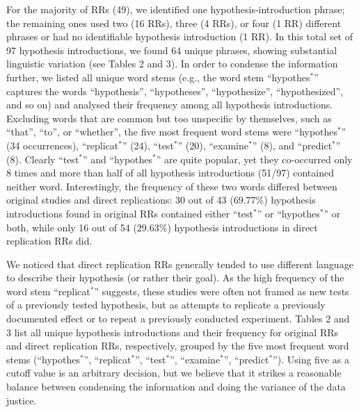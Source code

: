 \documentclass[british,,man,floatsintext]{apa6}
\begin{document}
For the majority of RRs (49), we identified one hypothesis-introduction phrase; the remaining ones used two (16 RRs), three (4 RRs), or four (1 RR) different phrases or had no identifiable hypothesis introduction (1 RR).
In this total set of 97 hypothesis introductions, we found 64 unique phrases, showing substantial linguistic variation (see Tables 2 and 3).
In order to condense the information further, we listed all unique word stems (e.g., the word stem \enquote{hypothes\(^\ast\)} captures the words \enquote{hypothesis}, \enquote{hypotheses}, \enquote{hypothesize}, \enquote{hypothesized}, and so on) and analysed their frequency among all hypothesis introductions.
Excluding words that are common but too unspecific by themselves, such as \enquote{that}, \enquote{to}, or \enquote{whether}, the five most frequent word stems were \enquote{hypothes\(^\ast\)} (34 occurrences), \enquote{replicat\(^\ast\)} (24), \enquote{test\(^\ast\)} (20), \enquote{examine\(^\ast\)} (8), and \enquote{predict\(^\ast\)} (8).
Clearly \enquote{test\(^\ast\)} and \enquote{hypothes\(^\ast\)} are quite popular, yet they co-occurred only 8 times and more than half of all hypothesis introductions (51/97) contained neither word. Interestingly, the frequency of these two words differed between original studies and direct replications: 30 out of 43 (\(69.77\%\)) hypothesis introductions found in original RRs contained either \enquote{test\(^\ast\)} or \enquote{hypothes\(^\ast\)} or both, while only 16 out of 54 (\(29.63\%\)) hypothesis introductions in direct replication RRs did.

We noticed that direct replication RRs generally tended to use different language to describe their hypothesis (or rather their goal). As the high frequency of the word stem \enquote{replicat\(^\ast\)} suggests, these studies were often not framed as new tests of a previously tested hypothesis, but as attempts to replicate a previously documented effect or to repeat a previously conducted experiment.
Tables 2 and 3 list all unique hypothesis introductions and their frequency for original RRs and direct replication RRs, respectively, grouped by the five most frequent word stems (\enquote{hypothes\(^\ast\)}, \enquote{replicat\(^\ast\)}, \enquote{test\(^\ast\)}, \enquote{examine\(^\ast\)}, \enquote{predict\(^\ast\)}).
Using five as a cutoff value is an arbitrary decision, but we believe that it strikes a reasonable balance between condensing the information and doing the variance of the data justice.
\end{document}
